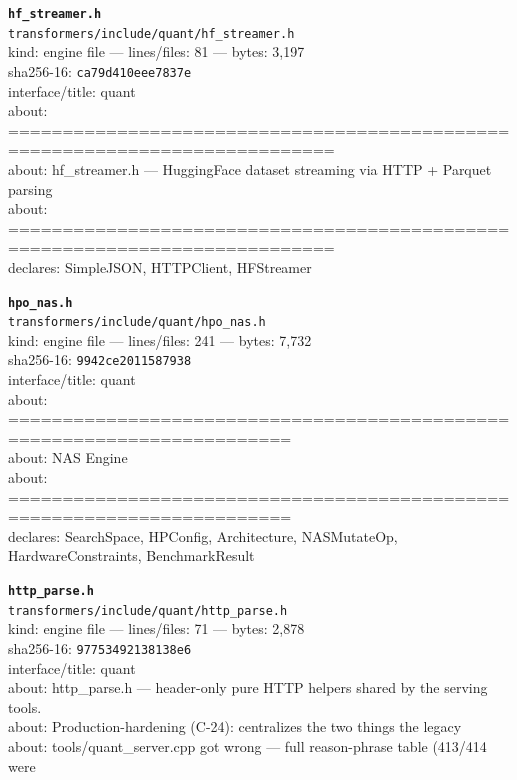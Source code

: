 \noindent\textbf{\texttt{hf\_streamer.h}}\\
\texttt{transformers/include/quant/hf\_streamer.h}\\
kind: engine file --- lines/files: 81 --- bytes: 3,197\\
sha256-16: \texttt{ca79d410eee7837e}\\
interface/title: quant\\
about: ============================================================================\\
about: hf\_streamer.h — HuggingFace dataset streaming via HTTP + Parquet parsing\\
about: ============================================================================\\
declares: SimpleJSON, HTTPClient, HFStreamer\\
\vspace*{6.0pt}
\newpage

\noindent\textbf{\texttt{hpo\_nas.h}}\\
\texttt{transformers/include/quant/hpo\_nas.h}\\
kind: engine file --- lines/files: 241 --- bytes: 7,732\\
sha256-16: \texttt{9942ce2011587938}\\
interface/title: quant\\
about: ========================================================================\\
about: NAS Engine\\
about: ========================================================================\\
declares: SearchSpace, HPConfig, Architecture, NASMutateOp, HardwareConstraints, BenchmarkResult\\
\vspace*{6.0pt}

\noindent\textbf{\texttt{http\_parse.h}}\\
\texttt{transformers/include/quant/http\_parse.h}\\
kind: engine file --- lines/files: 71 --- bytes: 2,878\\
sha256-16: \texttt{97753492138138e6}\\
interface/title: quant\\
about: http\_parse.h — header-only pure HTTP helpers shared by the serving tools.\\
about: Production-hardening (C-24): centralizes the two things the legacy\\
about: tools/quant\_server.cpp got wrong — full reason-phrase table (413/414 were\\
\vspace*{6.0pt}

